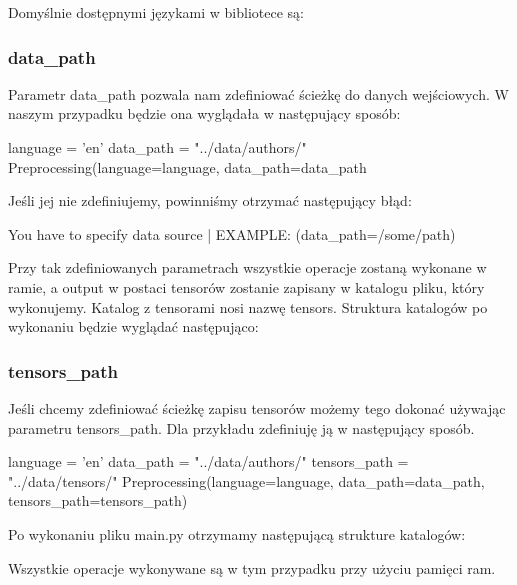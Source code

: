 Domyślnie dostępnymi językami w bibliotece są:

\languages 

\subsubsection{data\_path}
Parametr data\_path pozwala nam zdefiniować ścieżkę do danych wejściowych. W naszym przypadku
będzie ona wyglądała w następujący sposób:
\begin{python}
language = 'en'
data_path = "../data/authors/"
Preprocessing(language=language,
              data_path=data_path
                   
\end{python}

Jeśli jej nie zdefiniujemy, powinniśmy otrzymać następujący błąd:

\begin{consolerror}
You have to specify data source | EXAMPLE: (data_path=/some/path)
\end{consolerror}

Przy tak zdefiniowanych parametrach wszystkie operacje zostaną wykonane w ramie, a output w postaci
tensorów zostanie zapisany w katalogu pliku, który wykonujemy. Katalog z tensorami nosi nazwę tensors.
Struktura katalogów po wykonaniu będzie wyglądać następująco:

\myspace
{}
\myspace


\subsubsection{tensors\_path}
Jeśli chcemy zdefiniować ścieżkę zapisu tensorów możemy tego dokonać używając parametru tensors\_path.
Dla przykładu zdefiniuję ją w następujący sposób. 
\begin{python}
language = 'en'
data_path = "../data/authors/"
tensors_path = "../data/tensors/"
Preprocessing(language=language,
              data_path=data_path,
              tensors_path=tensors_path)
                   
\end{python}

Po wykonaniu pliku main.py otrzymamy następującą strukture katalogów:
\myspace
{}
\myspace

Wszystkie operacje wykonywane są w tym przypadku przy użyciu pamięci ram.


